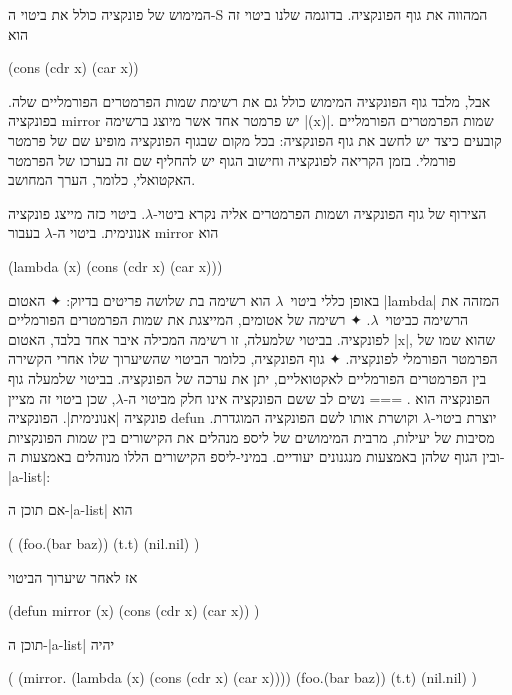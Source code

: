 המימוש של פונקציה כולל את ביטוי ה-S המהווה את גוף הפונקציה. בדוגמה שלנו ביטוי
זה הוא
\begin{LISP}
(cons (cdr x) (car x))
\end{LISP}
אבל, מלבד גוף הפונקציה המימוש כולל גם את רשימת שמות הפרמטרים הפורמליים שלה.
בפונקציה mirror יש פרמטר אחד אשר מיוצג ברשימה \T|(x)|. שמות הפרמטרים הפורמליים
קובעים כיצד יש לחשב את גוף הפונקציה: בכל מקום שבגוף הפונקציה מופיע שם של פרמטר
פורמלי. בזמן הקריאה לפונקציה וחישוב הגוף יש להחליף שם זה בערכו של הפרמטר
האקטואלי, כלומר, הערך המחושב.

הצירוף של גוף הפונקציה ושמות הפרמטרים אליה נקרא ביטוי-$λ$. ביטוי כזה
מייצג פונקציה אנונימית. ביטוי ה-$λ$ בעבור mirror הוא
\begin{LISP}
  (lambda (x) (cons (cdr x) (car x)))
\end{LISP}

באופן כללי ביטוי~$λ$ הוא רשימה בת שלושה פריטים בדיוק:
✦ האטום \T|lambda| המזהה את הרשימה כביטוי~$λ$.
✦ רשימה של אטומים, המייצגת את שמות הפרמטרים הפורמליים לפונקציה.
בביטוי שלמעלה, זו רשימה המכילה איבר אחד בלבד, האטום \E|x|, שהוא שמו של הפרמטר הפורמלי לפונקציה.
✦ גוף הפונקציה, כלומר הביטוי שהשיערוך שלו אחרי הקשירה בין הפרמטרים
הפורמליים לאקטואליים, יתן את ערכה של הפונקציה. בביטוי שלמעלה גוף הפונקציה הוא
.
===
נשים לב ששם הפונקציה אינו חלק מביטוי ה-$λ$, שכן ביטוי זה מציין פונקציה
\ע|אנונימית|. הפונקציה defun יוצרת ביטוי-$λ$ וקושרת אותו לשם הפונקציה המוגדרת.
מסיבות של יעילות, מרבית המימושים של ליספ מנהלים את הקישורים בין שמות הפונקציות
ובין הגוף שלהן באמצעות מנגנונים יעודיים. במיני-ליספ הקישורים הללו מנוהלים
באמצעות ה-\E|a-list|:

אם תוכן ה-\E|a-list| הוא
\begin{LISP}
(
  (foo.(bar baz))
  (t.t)
  (nil.nil)
)
\end{LISP}
אז לאחר שיערוך הביטוי
\begin{LISP}
(defun
  mirror (x)
  (cons (cdr x) (car x))
)
\end{LISP}
תוכן ה-\E|a-list| יהיה
\begin{LISP}
(
  (mirror.
     (lambda (x)
        (cons (cdr x) (car x))))
  (foo.(bar baz))
  (t.t)
  (nil.nil)
)
\end{LISP}


